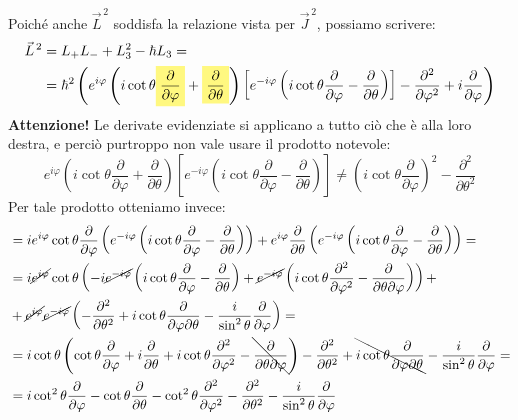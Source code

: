 \documentclass[../../FisicaTeorica.tex]{subfiles}
\begin{document}
Poiché anche $\vec{L}^{\,2}$ soddisfa la relazione vista per $\vec{J}^{\,2}$, possiamo scrivere:
\begin{align*}
\vec{L}^{\,2}&=L_+ L_- + L_3^2 -\hbar L_3 =\\
&=\hbar^2\left ( e^{i\varphi} \left(i \cot \theta \hlc{Yellow}{\frac{\partial}{\partial \varphi}}+\hlc{Yellow}{\frac{\partial }{\partial \theta}}\right)\left[e^{-i\varphi}\left(i \cot\theta \frac{\partial}{\partial \varphi}-\frac{\partial}{\partial \theta}\right)\right] -\frac{\partial^2}{\partial \varphi^2}+i\frac{\partial}{\partial \varphi}\right)
\end{align*}
\textbf{Attenzione!} Le derivate evidenziate si applicano a tutto ciò che è alla loro destra, e perciò purtroppo non vale usare il prodotto notevole:
\[
e^{i\varphi} \left(i \cot \theta \frac{\partial}{\partial \varphi}+{\frac{\partial }{\partial \theta}}\right)\left[e^{-i\varphi}\left(i \cot\theta \frac{\partial}{\partial \varphi}-\frac{\partial}{\partial \theta}\right)\right] 
\neq \left(i\cot \theta \frac{\partial}{\partial \varphi}\right)^2 - \frac{\partial^2}{\partial \theta^2}
\]
Per tale prodotto otteniamo invece:
\begin{align*}
&= ie^{i\varphi} \cot\theta \frac{\partial}{\partial \varphi} \left (e^{-i\varphi} \left( i\cot\theta \frac{\partial}{\partial \varphi}-\frac{\partial}{\partial \theta}\right)\right)
+ e^{i\varphi} \frac{\partial}{\partial \theta}\left(e^{-i\varphi} \left(i\cot\theta\frac{\partial}{\partial \varphi}-\frac{\partial}{\partial \theta}\right)\right)=\\
&=i\cancel{e^{i\varphi}}\cot\theta\left(-i\cancel{e^{-i\varphi}}\left(i\cot\theta \frac{\partial}{\partial\varphi}-\frac{\partial}{\partial \theta}\right) + \cancel{e^{-i\varphi}}\left(i\cot\theta \frac{\partial^2}{\partial \varphi^2}-\frac{\partial}{\partial \theta\partial \varphi}\right)\right)+\\
&+ \cancel{e^{i\varphi}}\cancel{e^{-i\varphi}}\left(-\frac{\partial^2}{\partial \theta^2} + i\cot\theta\frac{\partial}{\partial\varphi\partial \theta} -\frac{i}{\sin^2\theta}\frac{\partial}{\partial \varphi} \right) =\\
&= i\cot\theta \left( \cot\theta \frac{\partial}{\partial \varphi}+i\frac{\partial}{\partial \theta} + i\cot\theta \frac{\partial^2}{\partial \varphi^2} -\bcancel{\frac{\partial}{\partial \theta \partial \varphi}} \right) -\frac{\partial^2}{\partial \theta^2}+\bcancel{i\cot\theta \frac{\partial}{\partial \varphi\partial \theta}}-\frac{i}{\sin^2\theta}\frac{\partial}{\partial \varphi} =\\
&= i\cot^2\theta \frac{\partial}{\partial \varphi}-\cot\theta\frac{\partial}{\partial \theta}-\cot^2\theta\frac{\partial^2}{\partial \varphi^2} -\frac{\partial^2}{\partial \theta^2} -\frac{i}{\sin^2 \theta}\frac{\partial}{\partial \varphi}
\end{align*}
\end{document}
